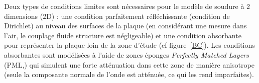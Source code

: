 Deux types de conditions limites sont nécessaires pour le modèle de soudure à 2 dimensions (2D) : une condition parfaitement réfléchissante (condition de Dirichlet) au niveau des surfaces de la plaque (en considérant une mesure dans l'air, le couplage fluide structure est négligeable) et une condition absorbante pour représenter la plaque loin de la zone d'étude (cf figure~\ref{BC}). Les conditions absorbantes sont modélisées à l'aide de zones éponges \emph{Perfectly Matched Layers} (PML,\cite{berenger}) qui simulent une forte atténuation dans cette zone de manière anisotrope (seule la composante normale de l'onde est atténuée, ce qui les rend imparfaites).\\

\begin{figure}[!h]
	\centering
\end{figure}
